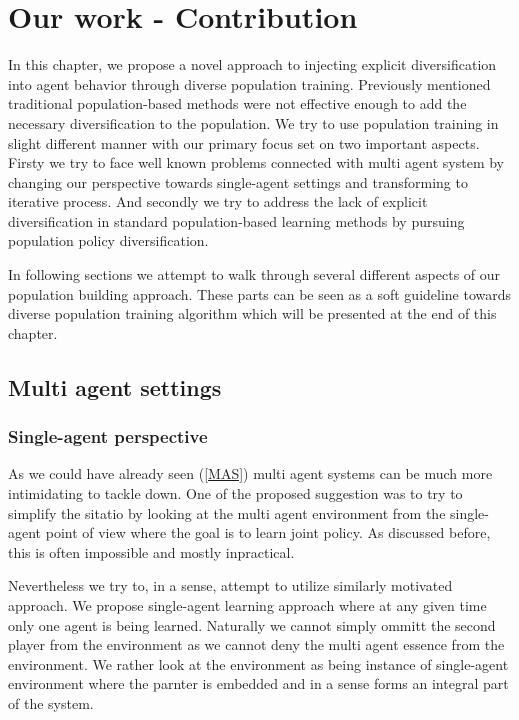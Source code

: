 \chapter{Our work - Contribution}
In this chapter, we propose a novel approach to injecting explicit diversification into agent behavior through diverse population training.
Previously mentioned traditional population-based methods were not effective enough to add the necessary diversification to the population.
We try to use population training in slight different manner with our primary focus set on two important aspects.
Firsty we try to face well known problems connected with multi agent system by changing our perspective towards single-agent settings and transforming to iterative process.
And secondly we try to address the lack of explicit diversification in standard population-based learning methods by pursuing population policy diversification. 

In following sections we attempt to walk through several different aspects of our population building approach.
These parts can be seen as a soft guideline towards diverse population training algorithm which will be presented at the end of this chapter.

\section{Multi agent settings}

\subsection{Single-agent perspective}
As we could have already seen (\ref{MAS}) multi agent systems can be much more intimidating to tackle down.
One of the proposed suggestion was to try to simplify the sitatio by looking at the multi agent environment from the single-agent point of view where the goal is to learn joint policy.
As discussed before, this is often impossible and mostly inpractical.

Nevertheless we try to, in a sense, attempt to utilize similarly motivated approach.
We propose single-agent learning approach where at any given time only one agent is being learned.
Naturally we cannot simply ommitt the second player from the environment as we cannot deny the multi agent essence from the environment.
We rather look at the environment as being instance of single-agent environment where the parnter is embedded and in a sense forms an integral part of the system.

